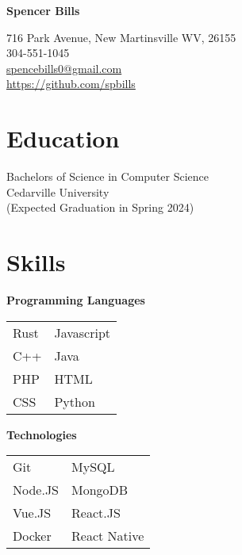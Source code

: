 \documentclass[10pt]{article}
\begin{document}
    \begin{paracol}{2}
        \parbox[top][0.08\textheight][c]{\linewidth}{
            \textbf{\Huge{Spencer Bills}}
        }
        
        \switchcolumn
        
        \parbox[top][0.08\textheight][c]{\linewidth}{
                    716 Park Avenue, New Martinsville WV, 26155 \\
                    304-551-1045 \\
                    \href{mailto://spencebills0@gmail.com}{spencebills0@gmail.com} \\
                    \url{https://github.com/spbills}
        }
        
        \switchcolumn

        \section*{Education}
        \parbox[top][][c]{\linewidth}{
            Bachelors of Science in Computer Science \\
            Cedarville University \\  
            (Expected Graduation in Spring 2024)
        }
        
        \vspace{0.25in}
        
        \section*{Skills}

        \parbox[top][][c]{\linewidth}{
            \begin{center}
                \textbf{Programming Languages}
            \end{center}
            \begin{tabularx}{\linewidth}{YY}

                Rust & Javascript \\
                C++ & Java \\
                PHP & HTML \\
                CSS & Python \\
            \end{tabularx}
            
            \begin{center}
                \textbf{Technologies}
            \end{center}
            \begin{tabularx}{\linewidth}{YY}
                Git & MySQL \\
                Node.JS & MongoDB \\
                Vue.JS & React.JS \\
                Docker & React Native 
            \end{tabularx}
        }


\end{paracol}
\end{document}
